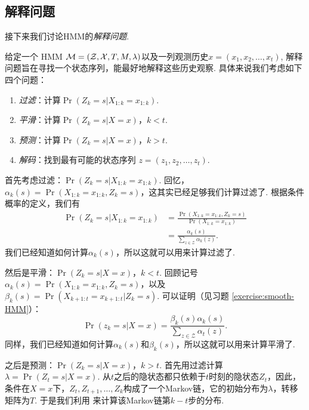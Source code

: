 \subsection{解释问题}
接下来我们讨论HMM的\textit{解释问题}. 

给定一个 HMM $\mathcal M = (\mathcal Z, \mathcal X, T, M, \lambda)$以及一列观测历史$x = (x_1, x_2, \dots, x_t)$, 解释问题旨在寻找一个状态序列，能最好地解释这些历史观察. 具体来说我们考虑如下四个问题：
\begin{enumerate}
    \item \textit{过滤}：计算$\Pr(Z_k = s|X_{1:k}=x_{1:k})$.
    \item \textit{平滑}：计算$\Pr(Z_k = s|X=x)$，$k < t$.
    \item \textit{预测}：计算$\Pr(Z_k = s|X=x)$，$k > t$.
    \item \textit{解码}：找到最有可能的状态序列 $z = (z_1, z_2, \dots, z_t)$.
\end{enumerate}

首先考虑过滤：$\Pr(Z_k = s|X_{1:k}=x_{1:k})$. 回忆，$\alpha_k(s)= \Pr(X_{1:k}=x_{1:k}, Z_k=s)$，这其实已经足够我们计算过滤了. 根据条件概率的定义，我们有
\begin{align*}
    \Pr(Z_k = s|X_{1:k}=x_{1:k}) & = \frac{\Pr(X_{1:k}=x_{1:k}, Z_k=s)}{\Pr(X_{1:k}=x_{1:k})} \\
    &= \frac{\alpha_k(s)}{\sum_{z\in\mathcal Z}\alpha_k(z)}.
\end{align*}
我们已经知道如何计算$\alpha_k(s)$，所以这就可以用来计算过滤了.

然后是平滑：$\Pr(Z_k = s|X=x)$，$k < t$.  回顾记号$\alpha_k(s)= \Pr(X_{1:k}=x_{1:k}, Z_k=s)$，以及$\beta_k(s)=\Pr(X_{k+1:t}=x_{k+1:t} |Z_k=s)$. 可以证明（见习题 \ref{exercise:smooth-HMM}）：
\begin{equation}
    \Pr(z_k = s|X=x)=\frac{\beta_k(s)\alpha_k(s)}{\sum_{z\in\mathcal Z}\alpha_t(z)}.\label{eq:smooth}
\end{equation}
同样，我们已经知道如何计算$\alpha_k(s)$和$\beta_k(s)$，所以这就可以用来计算平滑了.

之后是预测：$\Pr(Z_k = s|X=x)$，$k > t$. 首先用过滤计算 $\lambda=\Pr(Z_t = s|X=x)$. 从$t$之后的隐状态都只依赖于$t$时刻的隐状态$Z_t$，因此，条件在$X=x$下，$Z_t,Z_{t+1},\dots,Z_k$构成了一个Markov链，它的初始分布为$\lambda$，转移矩阵为$T$. 于是我们利用 来计算该Markov链第$k-t$步的分布.

